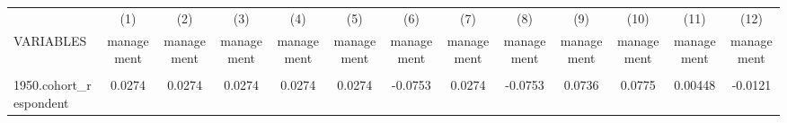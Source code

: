 \begin{center}
\begin{tabular}{lcccccccccccc} \hline
 & (1) & (2) & (3) & (4) & (5) & (6) & (7) & (8) & (9) & (10) & (11) & (12) \\
VARIABLES & management & management & management & management & management & management & management & management & management & management & management & management \\ \hline
\vspace{4pt} & \begin{footnotesize}\end{footnotesize} & \begin{footnotesize}\end{footnotesize} & \begin{footnotesize}\end{footnotesize} & \begin{footnotesize}\end{footnotesize} & \begin{footnotesize}\end{footnotesize} & \begin{footnotesize}\end{footnotesize} & \begin{footnotesize}\end{footnotesize} & \begin{footnotesize}\end{footnotesize} & \begin{footnotesize}\end{footnotesize} & \begin{footnotesize}\end{footnotesize} & \begin{footnotesize}\end{footnotesize} & \begin{footnotesize}\end{footnotesize} \\
1950.cohort\_respondent & 0.0274 & 0.0274 & 0.0274 & 0.0274 & 0.0274 & -0.0753 & 0.0274 & -0.0753 & 0.0736 & 0.0775 & 0.00448 & -0.0121 \\

\end{tabular}
\end{center}
